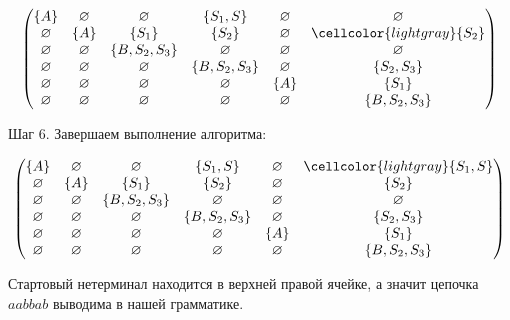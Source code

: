 \begin{example}
\[
\begin{pmatrix}
\{A\}       & \varnothing & \varnothing    & \{S_1, S\}       & \varnothing & \varnothing    \\
\varnothing & \{A\}       & \{S_1\}            & \{S_2\}          & \varnothing & \cellcolor{lightgray}\{S_2\}        \\
\varnothing & \varnothing & \{B, S_2, S_3\} & \varnothing     & \varnothing & \varnothing    \\
\varnothing & \varnothing & \varnothing    & \{B, S_2, S_3\}   & \varnothing & \{S_2, S_3\}  \\
\varnothing & \varnothing & \varnothing    & \varnothing      & \{A\}       & \{S_1\}            \\
\varnothing & \varnothing & \varnothing    & \varnothing      & \varnothing & \{B, S_2, S_3\} \\
\end{pmatrix}
\]

\bigbreak
Шаг 6. Завершаем выполнение алгоритма:

\[
\begin{pmatrix}
\{A\}       & \varnothing & \varnothing    & \{S_1, S\}       & \varnothing & \cellcolor{lightgray}\{S_1, S\}     \\
\varnothing & \{A\}       & \{S_1\}            & \{S_2\}          & \varnothing & \{S_2\}        \\
\varnothing & \varnothing & \{B, S_2, S_3\} & \varnothing     & \varnothing & \varnothing    \\
\varnothing & \varnothing & \varnothing    & \{B, S_2, S_3\}   & \varnothing & \{S_2, S_3\}  \\
\varnothing & \varnothing & \varnothing    & \varnothing      & \{A\}       & \{S_1\}            \\
\varnothing & \varnothing & \varnothing    & \varnothing      & \varnothing & \{B, S_2, S_3\} \\
\end{pmatrix}
\]


Стартовый нетерминал находится в верхней правой ячейке, а значит цепочка $a a b b a b$ выводима в нашей грамматике.
\end{example}


